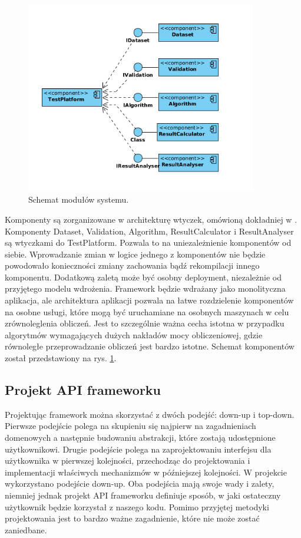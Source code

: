 \documentclass[12pt]{article}
\begin{document}
\begin{figure}
\centering
	\includegraphics[width=0.9\textwidth]{img/ModulesDiagram.png}
	\caption{Schemat modułów systemu.}
	\label{fig:modules_diagram}
\end{figure}

Komponenty są zorganizowane w architekturę wtyczek, omówioną dokładniej w \cite{clean-arch}. Komponenty Dataset, Validation, Algorithm, ResultCalculator i ResultAnalyser są wtyczkami do TestPlatform. Pozwala to na uniezależnienie komponentów od siebie. Wprowadzanie zmian w logice jednego z komponentów nie będzie powodowało konieczności zmiany zachowania bądź rekompilacji innego komponentu. Dodatkową zaletą może być osobny deployment, niezależnie od przyjętego modelu wdrożenia. Framework będzie wdrażany jako monolityczna aplikacja, ale architektura aplikacji pozwala na łatwe rozdzielenie komponentów na osobne usługi, które mogą być uruchamiane na osobnych maszynach w celu zrównoleglenia obliczeń. Jest to szczególnie ważna cecha istotna w przypadku algorytmów wymagających dużych nakładów mocy obliczeniowej, gdzie równoległe przeprowadzanie obliczeń jest bardzo istotne. Schemat komponentów został przedstawiony na rys. \ref{fig:modules_diagram}.


\subsection{Projekt API frameworku}
\label{ch:api}

Projektując framework można skorzystać z dwóch podejść: down-up i top-down. Pierwsze podejście polega na skupieniu się najpierw na zagadnieniach domenowych a następnie budowaniu abstrakcji, które zostają udostępnione użytkownikowi. Drugie podejście polega na zaprojektowaniu interfejsu dla użytkownika w pierwszej kolejności, przechodząc do projektowania i implementacji właściwych mechanizmów w późniejszej kolejności. W projekcie wykorzystano podejście down-up. Oba podejścia mają swoje wady i zalety, niemniej jednak projekt API frameworku definiuje sposób, w jaki ostateczny użytkownik będzie korzystał z naszego kodu. Pomimo przyjętej metodyki projektowania jest to bardzo ważne zagadnienie, które nie może zostać zaniedbane. 
\end{document}
